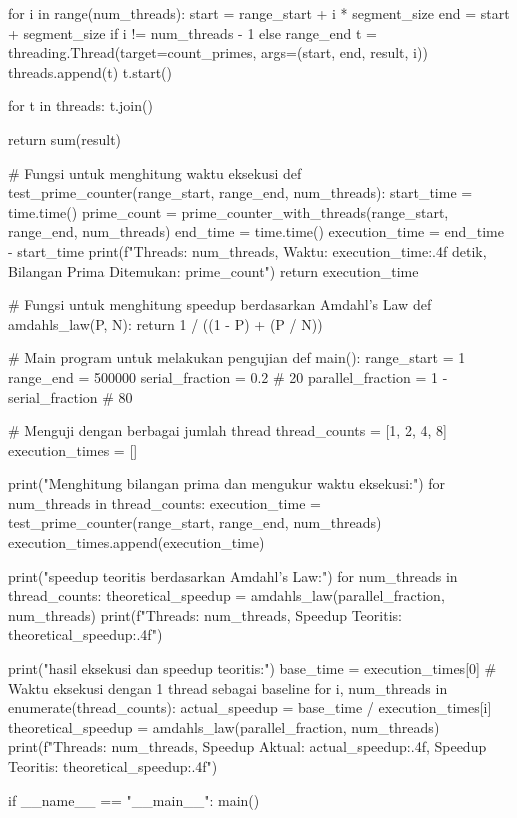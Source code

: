 \documentclass[12pt]{article}
\begin{document}
\begin{enumerate}
\begin{python}
    for i in range(num_threads):
        start = range_start + i * segment_size
        end = start + segment_size if i != num_threads - 1 else range_end
        t = threading.Thread(target=count_primes, args=(start, end, result, i))
        threads.append(t)
        t.start()

    for t in threads:
        t.join()

    return sum(result)

# Fungsi untuk menghitung waktu eksekusi
def test_prime_counter(range_start, range_end, num_threads):
    start_time = time.time()
    prime_count = prime_counter_with_threads(range_start, range_end, num_threads)
    end_time = time.time()
    execution_time = end_time - start_time
    print(f"Threads: {num_threads}, Waktu: {execution_time:.4f} detik, Bilangan Prima Ditemukan: {prime_count}")
    return execution_time

# Fungsi untuk menghitung speedup berdasarkan Amdahl's Law
def amdahls_law(P, N):
    return 1 / ((1 - P) + (P / N))

# Main program untuk melakukan pengujian
def main():
    range_start = 1
    range_end = 500000
    serial_fraction = 0.2  # 20%
    parallel_fraction = 1 - serial_fraction  # 80%

    # Menguji dengan berbagai jumlah thread
    thread_counts = [1, 2, 4, 8]
    execution_times = []

    print("Menghitung bilangan prima dan mengukur waktu eksekusi:")
    for num_threads in thread_counts:
        execution_time = test_prime_counter(range_start, range_end, num_threads)
        execution_times.append(execution_time)

    print("\nMenghitung speedup teoritis berdasarkan Amdahl's Law:")
    for num_threads in thread_counts:
        theoretical_speedup = amdahls_law(parallel_fraction, num_threads)
        print(f"Threads: {num_threads}, Speedup Teoritis: {theoretical_speedup:.4f}")

    print("\nMembandingkan hasil eksekusi dan speedup teoritis:")
    base_time = execution_times[0]  # Waktu eksekusi dengan 1 thread sebagai baseline
    for i, num_threads in enumerate(thread_counts):
        actual_speedup = base_time / execution_times[i]
        theoretical_speedup = amdahls_law(parallel_fraction, num_threads)
        print(f"Threads: {num_threads}, Speedup Aktual: {actual_speedup:.4f}, Speedup Teoritis: {theoretical_speedup:.4f}")

if __name__ == "__main__":
    main()


\end{python}
\end{enumerate}
\end{document}
